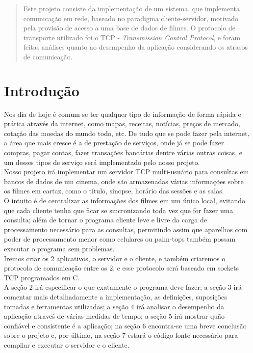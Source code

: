 \documentclass[11pt,twoside]{article}
\begin{document}
\begin{abstract}
Este projeto consiste da implementação de um sistema, que implementa comunicação em rede, baseado no paradigma cliente-servidor, motivado pela provisão de acesso a uma base de dados de filmes. O protocolo de transporte utilizado foi o TCP - \textit{Transmission Control Protocol}, e foram feitas análises quanto ao desempenho da aplicação considerando os atrasos de comunicação.
\end{abstract}

\section{Introdução}
Nos dia de hoje é comum se ter qualquer tipo de informação de forma rápida e prática através da internet, como mapas, receitas, notícias, preços de mercado, cotação das moedas do mundo todo, etc. De tudo que se pode fazer pela internet, a área que mais cresce é a de prestação de serviços, onde já se pode fazer compras, pagar contas, fazer transações bancárias dentre várias outras coisas, e um desses tipos de serviço será implementado pelo nosso projeto.\\
Nosso projeto irá implementar um servidor TCP multi-usuário para consultas em bancos de dados de um cinema, onde são armazenadas várias informações sobre os filmes em cartaz, como o título, sinopse, horário das sessões e as salas.\\
O intuito é de centralizar as informações dos filmes em um único local, evitando que cada cliente tenha que ficar se sincronizando toda vez que for fazer uma consulta; além de tornar o programa cliente leve e livre da carga de processamento necessário para as consultas, permitindo assim que aparelhos com poder de processamento menor como celulares ou palm-tops também possam executar o programa sem problemas.\\
Iremos criar os 2 aplicativos, o servidor e o cliente, e também criaremos o protocolo de comunicação entre os 2, e esse protocolo será baseado em sockets TCP programados em C.\\
A seção 2 irá especificar o que exatamente o programa deve fazer; a seção 3 irá comentar mais detalhadamente a implementação, as definições, suposições tomadas e ferramentas utilizadas; a seção 4 irá analisar o desempenho da aplicação atraveś de várias medidas de tempo; a seção 5 irá mostrar quão confiável e consistente é a aplicação; na seção 6 encontra-se uma breve conclusão sobre o projeto e, por último, na seção 7 estará o código fonte necessário para compilar e executar o servidor e o cliente.
\end{document}
